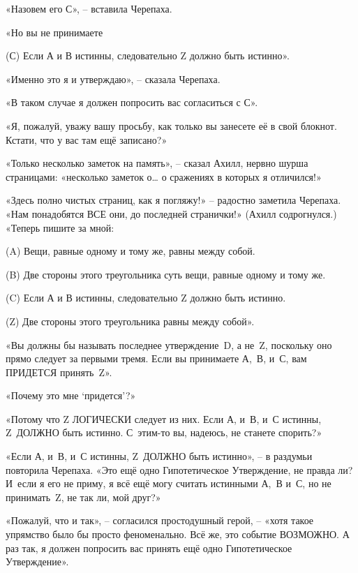 \documentclass[../main.tex]{subfiles}
\begin{document}
«Назовем его С», \--- вставила Черепаха.

«Но вы не принимаете

\begin{statements}
    \item[(С)] Если А и В истинны, следовательно Z должно быть истинно».
\end{statements}

«Именно это я и утверждаю», \--- сказала Черепаха.

«В таком случае я должен попросить вас согласиться с С».

«Я, пожалуй, уважу вашу просьбу, как только вы занесете её в свой блокнот. Кстати, что у вас там ещё записано?»

«Только несколько заметок на память», \--- сказал Ахилл, нервно шурша страницами: «несколько заметок о\ldots{} о сражениях в которых я отличился!»

«Здесь полно чистых страниц, как я погляжу!» \--- радостно заметила Черепаха. «Нам понадобятся ВСЕ они, до последней странички!» (Ахилл содрогнулся.) «Теперь пишите за мной:

\begin{statements}
    \item[(A)] Вещи, равные одному и тому же, равны между собой.
    \item[(B)] Две стороны этого треугольника суть вещи, равные одному и тому же.
    \item[(C)] Если А и В истинны, следовательно Z должно быть истинно.
    \item[(Z)] Две стороны этого треугольника равны между собой».
\end{statements}

«Вы должны бы называть последнее утверждение~D, а не~Z, поскольку оно прямо следует за первыми тремя. Если вы принимаете А,~В, и~С, вам ПРИДЕТСЯ принять~Z».

«Почему это мне \enquote*{придется}?»

«Потому что Z ЛОГИЧЕСКИ следует из них. Если А, и~В, и~С истинны, Z~ДОЛЖНО быть истинно. С~этим-то вы, надеюсь, не станете спорить?»

«Если А, и~В, и~С истинны, Z~ДОЛЖНО быть истинно», \--- в раздумьи повторила Черепаха. «Это ещё одно Гипотетическое Утверждение, не правда ли? И~если я его не приму, я всё ещё могу считать истинными А,~В и~С, но не принимать~Z, не так ли, мой друг?»

«Пожалуй, что и так», \--- согласился простодушный герой, \--- «хотя такое упрямство было бы просто феноменально. Всё же, это событие ВОЗМОЖНО\@. А раз так, я должен попросить вас принять ещё одно Гипотетическое Утверждение».
\end{document}
